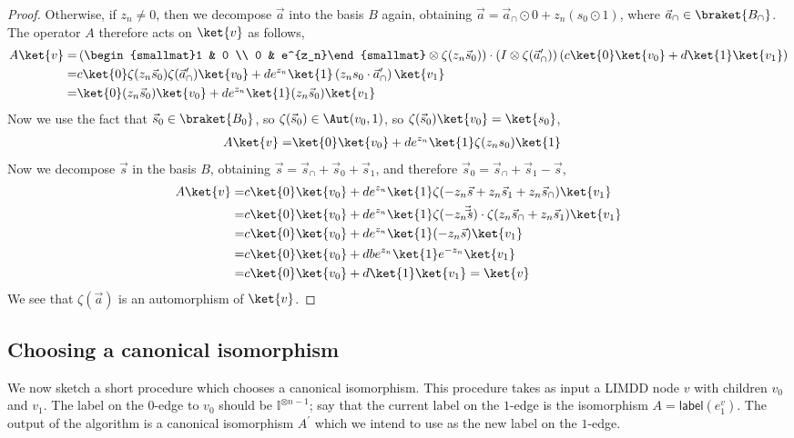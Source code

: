 \begin{proof}
	Otherwise, if $z_n\ne 0$, then we decompose $\vec a$ into the basis $B$ again, obtaining $\vec a=\vec a_\cap \odot 0 + z_n(s_0\odot 1)$, where $\vec a_\cap\in \braket{B_\cap}$.
	The operator $A$ therefore acts on $\ket{v}$ as follows,
	\begin{align}
		A\ket{v} = & \left( \begin{smallmat}1 & 0 \\ 0 & e^{z_n}\end{smallmat}\otimes \zeta(z_n\vec s_0) \right)\cdot \left( I\otimes \zeta(\vec a_\cap^\prime) \right)\left( c\ket{0}\ket{v_0} + d\ket{1}\ket{v_1} \right) \\
		= & c\ket{0}\zeta(z_n\vec s_0)\zeta(\vec a_\cap^\prime)\ket{v_0} + de^{z_n}\ket{1}\left( z_ns_0 \cdot \vec a_\cap^\prime\right)\ket{v_1} \\
		= & \ket{0}(z_n\vec s_0)\ket{v_0} + de^{z_n}\ket{1}(z_n\vec s_0)\ket{v_1}
	\end{align}
	Now we use the fact that $\vec s_0\in \braket{B_0}$, so $\zeta(\vec s_0)\in \Aut(v_0,1)$, so $\zeta(\vec s_0)\ket{v_0}=\ket{s_0}$,
	\begin{align}
		A\ket{v} = & \ket{0}\ket{v_0}+de^{z_n}\ket{1}\zeta(z_n s_0)\ket{1}
	\end{align}
	Now we decompose $\vec s$ in the basis $B$, obtaining $\vec s = \vec s_\cap + \vec s_0 + \vec s_1$, and therefore $\vec s_0 = \vec s_\cap + \vec s_1 - \vec s$,
	\begin{align}
		A\ket{v}= & c\ket{0}\ket{v_0} + de^{z_n}\ket{1}\zeta(-z_n\vec s + z_n\vec s_1 + z_n\vec s_\cap)\ket{v_1} \\
		= & c\ket{0}\ket{v_0} + de^{z_n}\ket{1}\zeta(-z_n\vec \vec s)\cdot\zeta(z_n\vec s_\cap + z_n\vec s_1)\ket{v_1} \\
		= & c\ket{0}\ket{v_0} + de^{z_n}\ket{1}(-z_n\vec s)\ket{v_1} \\
		= & c\ket{0}\ket{v_0} + dbe^{z_n}\ket{1}e^{-z_n}\ket{v_1} \\
		= & c\ket{0}\ket{v_0} + d\ket{1}\ket{v_1} = \ket{v}
	\end{align}
	We see that $\zeta(\vec a)$ is an automorphism of $\ket{v}$.
\end{proof}

\subsection{Choosing a canonical isomorphism}
\label{sec:choose-canonical-isomorphism-R}

We now sketch a short procedure which chooses a canonical isomorphism.
This procedure takes as input a LIMDD node $v$ with children $v_0$ and $v_1$.
The label on the $0$-edge to $v_0$ should be $\mathbb I^{\otimes n-1}$; say that the current label on the $1$-edge is the isomorphism $A=\textsf{label}(e_1^v)$.
The output of the algorithm is a canonical isomorphism $A^\prime$ which we intend to use as the new label on the $1$-edge.

